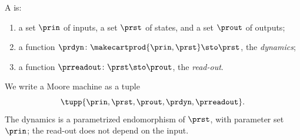 \begin{ctdefinition}
    \label{def:moore-machine-first}
    A  is:

    \constit
    \begin{enumerate}
        \item a set $\prin$ of inputs, a set $\prst$ of states, and a set $\prout$ of outputs;
        \item a function $\prdyn \colon \makecartprod{\prin, \prst} \sto \prst$, the \emph{dynamics};
        \item a function $\prreadout \colon \prst \sto \prout$, the \emph{read-out}.
    \end{enumerate}
\end{ctdefinition}

We write a Moore machine as a tuple
\begin{equation}
    \label{eq:moore-tuple}
    \tupp{\prin,\prst,\prout,\prdyn,\prreadout}.
\end{equation}
The dynamics is a parametrized endomorphism of $\prst$, with parameter set $\prin$; the read-out does not depend on the input.


